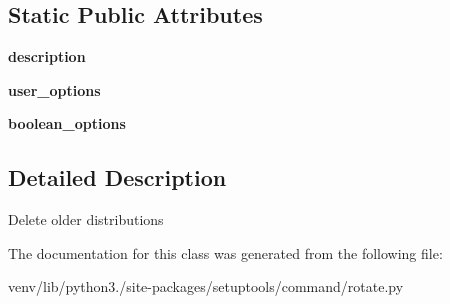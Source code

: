 \subsection*{Static Public Attributes}
\begin{DoxyCompactItemize}
\item 
\mbox{\label{classsetuptools_1_1command_1_1rotate_1_1rotate_a1e07682d8a76bcca138af3fa098afa7d}} 
{\bfseries description}
\item 
\mbox{\label{classsetuptools_1_1command_1_1rotate_1_1rotate_aa9debace43b98dc8851d0068c65bd6a0}} 
{\bfseries user\+\_\+options}
\item 
\mbox{\label{classsetuptools_1_1command_1_1rotate_1_1rotate_a001fbaa281e6810cea8c704e947e1df0}} 
{\bfseries boolean\+\_\+options}
\end{DoxyCompactItemize}


\subsection{Detailed Description}
\begin{DoxyVerb}Delete older distributions\end{DoxyVerb}
 

The documentation for this class was generated from the following file\+:\begin{DoxyCompactItemize}
\item 
venv/lib/python3./site-\/packages/setuptools/command/rotate.\+py\end{DoxyCompactItemize}
